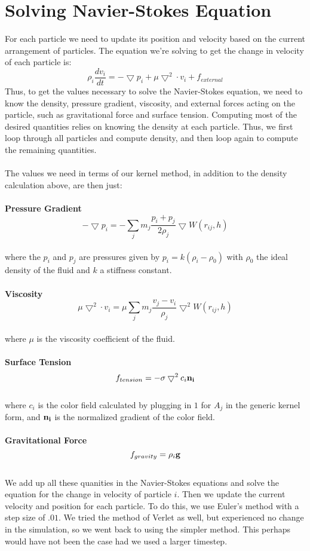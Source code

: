 \documentclass[11pt]{article}
\begin{document}
\section*{Solving Navier-Stokes Equation}
For each particle we need to update its position and velocity based on the current arrangement of particles. The equation we're solving to get the change in velocity of each particle is:
$$\rho_i \frac{dv_i}{dt} = - \bigtriangledown p_i + \mu \bigtriangledown^2 \cdot v_i + f_{external}$$
Thus, to get the values necessary to solve the Navier-Stokes equation, we need to know the density, pressure gradient, viscosity, and external forces acting on the particle, such as gravitational force and surface tension. Computing most of the desired quantities relies on knowing the density at each particle. Thus, we first loop through all particles and compute density, and then loop again to compute the remaining quantities.
\\
\\
The values we need in terms of our kernel method, in addition to the density calculation above, are then just:\\ \\
{\bf Pressure Gradient}
$$ - \bigtriangledown p_i = - \sum_{j}m_j \frac{p_i+p_j}{2\rho_j} \bigtriangledown W(r_{ij},h)$$
\\
where the $p_i$ and $p_j$ are pressures given by $p_i = k(\rho_i - \rho_0)$ with $\rho_0$ the ideal density of the fluid and $k$ a stiffness constant.
\\
\\
{\bf Viscosity}
$$ \mu \bigtriangledown^2 \cdot v_i = \mu  \sum_{j} m_j \frac{v_j-v_i}{\rho_j} \bigtriangledown^2 W(r_{ij},h) $$
\\
where $\mu$ is the viscosity coefficient of the fluid.
\\
\\
{\bf Surface Tension}
$$f_{tension} = -\sigma \bigtriangledown^2 c_i {\bf n_i}$$
\\
where $c_i$ is the color field calculated by plugging in $1$ for $A_j$ in the generic kernel form, and ${\bf n_i}$ is the normalized gradient of the color field.
\\
\\
{\bf Gravitational Force}
$$f_{gravity} = \rho_i {\bf g}$$
\\
We add up all these quanities in the Navier-Stokes equations and solve the equation for the change in velocity of particle $i$. Then we update the current velocity and position for each particle. To do this, we use Euler's method with a step size of $.01$.
We tried the method of Verlet as well, but experienced no change in the simulation, so we went back to using the simpler method. This perhaps would have not been the case had we used a larger timestep.
\end{document}
